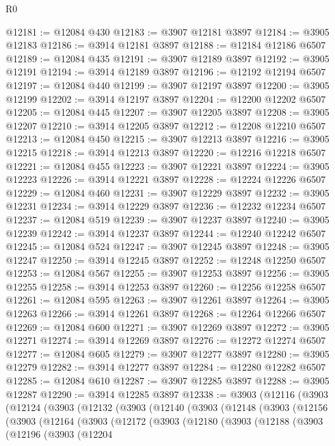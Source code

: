 \begin{lexlean}{R0}
\begin{coremodule}
@12181 := @12084 @430
@12183 := @3907 @12181 @3897
@12184 := @3905 @12183
@12186 := @3914 @12181 @3897
@12188 := @12184 @12186 @6507
@12189 := @12084 @435
@12191 := @3907 @12189 @3897
@12192 := @3905 @12191
@12194 := @3914 @12189 @3897
@12196 := @12192 @12194 @6507
@12197 := @12084 @440
@12199 := @3907 @12197 @3897
@12200 := @3905 @12199
@12202 := @3914 @12197 @3897
@12204 := @12200 @12202 @6507
@12205 := @12084 @445
@12207 := @3907 @12205 @3897
@12208 := @3905 @12207
@12210 := @3914 @12205 @3897
@12212 := @12208 @12210 @6507
@12213 := @12084 @450
@12215 := @3907 @12213 @3897
@12216 := @3905 @12215
@12218 := @3914 @12213 @3897
@12220 := @12216 @12218 @6507
@12221 := @12084 @455
@12223 := @3907 @12221 @3897
@12224 := @3905 @12223
@12226 := @3914 @12221 @3897
@12228 := @12224 @12226 @6507
@12229 := @12084 @460
@12231 := @3907 @12229 @3897
@12232 := @3905 @12231
@12234 := @3914 @12229 @3897
@12236 := @12232 @12234 @6507
@12237 := @12084 @519
@12239 := @3907 @12237 @3897
@12240 := @3905 @12239
@12242 := @3914 @12237 @3897
@12244 := @12240 @12242 @6507
@12245 := @12084 @524
@12247 := @3907 @12245 @3897
@12248 := @3905 @12247
@12250 := @3914 @12245 @3897
@12252 := @12248 @12250 @6507
@12253 := @12084 @567
@12255 := @3907 @12253 @3897
@12256 := @3905 @12255
@12258 := @3914 @12253 @3897
@12260 := @12256 @12258 @6507
@12261 := @12084 @595
@12263 := @3907 @12261 @3897
@12264 := @3905 @12263
@12266 := @3914 @12261 @3897
@12268 := @12264 @12266 @6507
@12269 := @12084 @600
@12271 := @3907 @12269 @3897
@12272 := @3905 @12271
@12274 := @3914 @12269 @3897
@12276 := @12272 @12274 @6507
@12277 := @12084 @605
@12279 := @3907 @12277 @3897
@12280 := @3905 @12279
@12282 := @3914 @12277 @3897
@12284 := @12280 @12282 @6507
@12285 := @12084 @610
@12287 := @3907 @12285 @3897
@12288 := @3905 @12287
@12290 := @3914 @12285 @3897
@12338 := @3903
    (@12116
      (@3903
        (@12124
          (@3903
            (@12132
              (@3903
                (@12140
                  (@3903
                    (@12148
                      (@3903
                        (@12156
                          (@3903
                            (@12164
                              (@3903
                                (@12172
                                  (@3903
                                    (@12180
                                      (@3903
                                        (@12188
                                          (@3903
                                            (@12196
                                              (@3903
                                                (@12204

\end{coremodule}
\end{lexlean}

